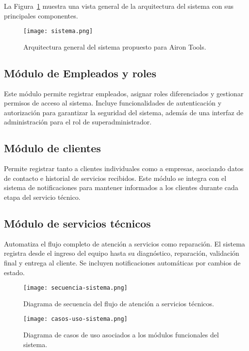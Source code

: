 La Figura~\ref{fig:arquitectura} muestra una vista general de la arquitectura del sistema con sus principales componentes.

\begin{figure}[H]
	\centering
	\texttt{[image: sistema.png]}
	\caption{Arquitectura general del sistema propuesto para Airon Tools.}
	\label{fig:arquitectura}
\end{figure}

\subsection*{Módulo de Empleados y roles}

Este módulo permite registrar empleados, asignar roles diferenciados y gestionar permisos de acceso al sistema. Incluye funcionalidades de autenticación y autorización para garantizar la seguridad del sistema, además de una interfaz de administración para el rol de superadministrador.

\subsection*{Módulo de clientes}

Permite registrar tanto a clientes individuales como a empresas, asociando datos de contacto e historial de servicios recibidos. Este módulo se integra con el sistema de notificaciones para mantener informados a los clientes durante cada etapa del servicio técnico.

\subsection*{Módulo de servicios técnicos}

Automatiza el flujo completo de atención a servicios como reparación. El sistema registra desde el ingreso del equipo hasta su diagnóstico, reparación, validación final y entrega al cliente. Se incluyen notificaciones automáticas por cambios de estado.

\begin{figure}[H]
	\centering
	\texttt{[image: secuencia-sistema.png]}
	\caption{Diagrama de secuencia del flujo de atención a servicios técnicos.}
	\label{fig:secuencia}
\end{figure}

\begin{figure}[H]
	\centering
	\texttt{[image: casos-uso-sistema.png]}
	\caption{Diagrama de casos de uso asociados a los módulos funcionales del sistema.}
	\label{fig:casosuso}
\end{figure}

